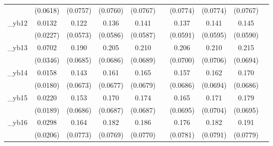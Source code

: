 \begin{table}[htbp]
\begin{tabular}{l*{9}{c}}
            &    (0.0618)         &    (0.0757)         &    (0.0760)         &    (0.0767)         &                     &    (0.0774)         &    (0.0774)         &    (0.0767)         &                     \\
[1em]
\_yb12       &      0.0132         &       0.122\sym{**} &       0.136\sym{**} &       0.141\sym{**} &                     &       0.137\sym{**} &       0.141\sym{**} &       0.145\sym{**} &                     \\
            &    (0.0227)         &    (0.0573)         &    (0.0586)         &    (0.0587)         &                     &    (0.0591)         &    (0.0595)         &    (0.0590)         &                     \\
[1em]
\_yb13       &      0.0702\sym{**} &       0.190\sym{***}&       0.205\sym{***}&       0.210\sym{***}&                     &       0.206\sym{***}&       0.210\sym{***}&       0.215\sym{***}&                     \\
            &    (0.0346)         &    (0.0685)         &    (0.0686)         &    (0.0689)         &                     &    (0.0700)         &    (0.0706)         &    (0.0694)         &                     \\
[1em]
\_yb14       &      0.0158         &       0.143\sym{**} &       0.161\sym{**} &       0.165\sym{**} &                     &       0.157\sym{**} &       0.162\sym{**} &       0.170\sym{**} &                     \\
            &    (0.0180)         &    (0.0673)         &    (0.0677)         &    (0.0679)         &                     &    (0.0686)         &    (0.0694)         &    (0.0686)         &                     \\
[1em]
\_yb15       &      0.0220         &       0.153\sym{**} &       0.170\sym{**} &       0.174\sym{**} &                     &       0.165\sym{**} &       0.171\sym{**} &       0.179\sym{**} &                     \\
            &    (0.0189)         &    (0.0686)         &    (0.0687)         &    (0.0687)         &                     &    (0.0695)         &    (0.0704)         &    (0.0695)         &                     \\
[1em]
\_yb16       &      0.0298         &       0.164\sym{**} &       0.182\sym{**} &       0.186\sym{**} &                     &       0.176\sym{**} &       0.182\sym{**} &       0.191\sym{**} &                     \\
            &    (0.0206)         &    (0.0773)         &    (0.0769)         &    (0.0770)         &                     &    (0.0781)         &    (0.0791)         &    (0.0779)         &                     \\

\end{tabular}
\end{table}
